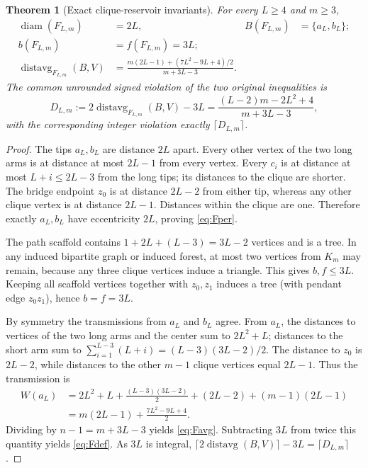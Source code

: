 \documentclass[11pt,a4paper]{article}
\newtheorem{theorem}{Theorem}[section]
\theoremstyle{definition}
\theoremstyle{remark}
\newcommand{\avg}{\operatorname{distavg}}
\newcommand{\diam}{\operatorname{diam}}
\begin{document}
\begin{theorem}[Exact clique-reservoir invariants]\label{thm:Fexact}
For every $L\ge4$ and $m\ge3$,
\begin{align}
\diam(F_{L,m})&=2L, & B(F_{L,m})&=\{a_L,b_L\};\label{eq:Fper}\\
b(F_{L,m})&=f(F_{L,m})=3L;\label{eq:Fbf}\\
\avg_{F_{L,m}}(B,V)&=\frac{m(2L-1)+(7L^2-9L+4)/2}{m+3L-3}.\label{eq:Favg}
\end{align}
The common unrounded signed violation of the two original inequalities is
\begin{equation}\label{eq:Fdef}
 D_{L,m}:=2\avg_{F_{L,m}}(B,V)-3L
 =\frac{(L-2)m-2L^2+4}{m+3L-3},
\end{equation}
with the corresponding integer violation exactly $\lceil D_{L,m}\rceil$.
\end{theorem}
\begin{proof}
The tips $a_L,b_L$ are distance $2L$ apart. Every other vertex of the two long arms is at distance at most $2L-1$ from every vertex. Every $c_i$ is at distance at most $L+i\le2L-3$ from the long tips; its distances to the clique are shorter. The bridge endpoint $z_0$ is at distance $2L-2$ from either tip, whereas any other clique vertex is at distance $2L-1$. Distances within the clique are one. Therefore exactly $a_L,b_L$ have eccentricity $2L$, proving \eqref{eq:Fper}.

The path scaffold contains $1+2L+(L-3)=3L-2$ vertices and is a tree. In any induced bipartite graph or induced forest, at most two vertices from $K_m$ may remain, because any three clique vertices induce a triangle. This gives $b,f\le3L$. Keeping all scaffold vertices together with $z_0,z_1$ induces a tree (with pendant edge $z_0z_1$), hence $b=f=3L$.

By symmetry the transmissions from $a_L$ and $b_L$ agree. From $a_L$, the distances to vertices of the two long arms and the center sum to $2L^2+L$; distances to the short arm sum to $\sum_{i=1}^{L-3}(L+i)=(L-3)(3L-2)/2$. The distance to $z_0$ is $2L-2$, while distances to the other $m-1$ clique vertices equal $2L-1$. Thus the transmission is
\[
 \begin{aligned}
 W(a_L)&=2L^2+L+\frac{(L-3)(3L-2)}2+(2L-2)+(m-1)(2L-1)\\
 &=m(2L-1)+\frac{7L^2-9L+4}2.
 \end{aligned}
\]
Dividing by $n-1=m+3L-3$ yields \eqref{eq:Favg}. Subtracting $3L$ from twice this quantity yields \eqref{eq:Fdef}. As $3L$ is integral, $\lceil2\avg(B,V)\rceil-3L=\lceil D_{L,m}\rceil$.
\end{proof}
\end{document}
